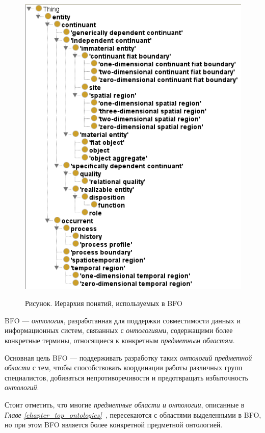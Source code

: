 \begin{figure}[H]
	\caption{Рисунок. Иерархия понятий, используемых в BFO}
	\includegraphics[scale=0.6]{author/part2/figures/chapter_kb/bfo.png}
	\label{fig:bfo}
\end{figure}

BFO --- \textit{онтология}, разработанная для поддержки совместимости данных и информационных систем, связанных с \textit{онтологиями}, содержащими более конкретные термины, относящиеся к конкретным \textit{предметным областям}.

Основная цель BFO --- поддерживать разработку таких \textit{онтологий предметной области} с тем, чтобы способствовать координации работы различных групп специалистов, добиваться непротиворечивости и предотвращать избыточность \textit{онтологий}.

Стоит отметить, что многие \textit{предметные области и онтологии}, описанные в \textit{Главе \ref{chapter_top_ontologies}~}, пересекаются с областями выделенными в BFO, но при этом BFO является более конкретной предметной онтологией. 

